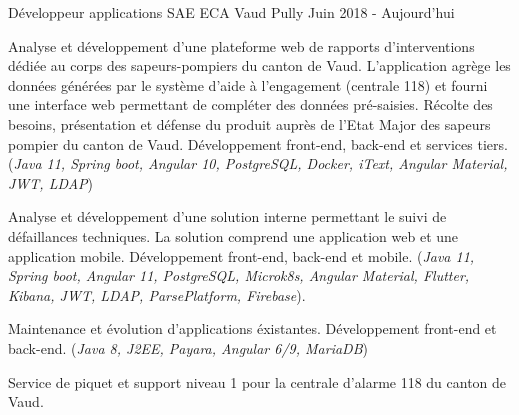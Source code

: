 


\begin{cventries}


\cventry
{Développeur applications SAE} %
{ECA Vaud} %
{Pully} %
{Juin 2018 - Aujourd'hui} %
{ %
\begin{cvitems}
\item {Analyse et développement d'une plateforme web de rapports d'interventions dédiée au corps des sapeurs-pompiers du canton de Vaud.
L'application agrège les données générées par le système d'aide à l'engagement (centrale 118) et fourni une interface web permettant de compléter des données pré-saisies.
Récolte des besoins, présentation et défense du produit auprès de l'Etat Major des sapeurs pompier du canton de Vaud. Développement front-end, back-end et services tiers.
(\emph{Java 11, Spring boot, Angular 10, PostgreSQL, Docker, iText, Angular Material, JWT, LDAP})}
\item {Analyse et développement d'une solution interne permettant le suivi de défaillances techniques. La solution comprend une application web et une application mobile. Développement front-end, back-end et mobile. (\emph{Java 11, Spring boot, Angular 11, PostgreSQL, Microk8s, Angular Material, Flutter, Kibana, JWT, LDAP, ParsePlatform, Firebase}).}
\item {Maintenance et évolution d'applications éxistantes. Développement front-end et back-end. (\emph{Java 8, J2EE, Payara, Angular 6/9, MariaDB})}
\item {Service de piquet et support niveau 1 pour la centrale d'alarme 118 du canton de Vaud.}
\end{cvitems}
}



\end{cventries}
